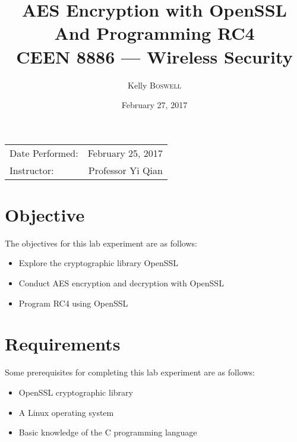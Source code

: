 \documentclass{article}
\title{AES Encryption with OpenSSL \\ And Programming RC4 \\ CEEN 8886 --- Wireless Security} %
\author{Kelly \textsc{Boswell}} %
\date{\Large February 27, 2017} %
\begin{document}
\maketitle %

\begin{center}
\begin{tabular}{l r}
Date Performed: & February 25, 2017 \\ %
Instructor: & Professor Yi Qian %
\end{tabular}
\end{center}



\section{Objective}

The objectives for this lab experiment are as follows:

\begin{itemize}
\item Explore the cryptographic library OpenSSL
\item Conduct AES encryption and decryption with OpenSSL
\item Program RC4 using OpenSSL
\end{itemize}


\section{Requirements}

Some prerequisites for completing this lab experiment are as follows:

\begin{itemize}
\item OpenSSL cryptographic library
\item A Linux operating system
\item Basic knowledge of the C programming language
\end{itemize}
\end{document}
